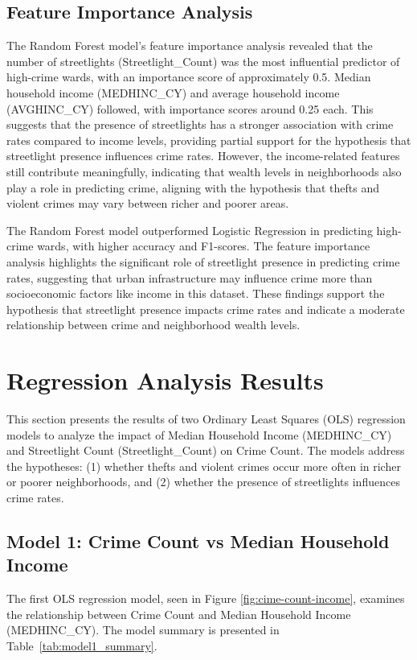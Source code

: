 \documentclass{report}
\begin{document}
\subsection{Feature Importance Analysis}
The Random Forest model's feature importance analysis revealed that the number of streetlights (Streetlight\_Count) was the most influential predictor of high-crime wards, with an importance score of approximately 0.5. Median household income (MEDHINC\_CY) and average household income (AVGHINC\_CY) followed, with importance scores around 0.25 each. This suggests that the presence of streetlights has a stronger association with crime rates compared to income levels, providing partial support for the hypothesis that streetlight presence influences crime rates. However, the income-related features still contribute meaningfully, indicating that wealth levels in neighborhoods also play a role in predicting crime, aligning with the hypothesis that thefts and violent crimes may vary between richer and poorer areas.
\par The Random Forest model outperformed Logistic Regression in predicting high-crime wards, with higher accuracy and F1-scores. The feature importance analysis highlights the significant role of streetlight presence in predicting crime rates, suggesting that urban infrastructure may influence crime more than socioeconomic factors like income in this dataset. These findings support the hypothesis that streetlight presence impacts crime rates and indicate a moderate relationship between crime and neighborhood wealth levels.

\section{Regression Analysis Results}

\par This section presents the results of two Ordinary Least Squares (OLS) regression models to analyze the impact of Median Household Income (MEDHINC\_CY) and Streetlight Count (Streetlight\_Count) on Crime Count. The models address the hypotheses: (1) whether thefts and violent crimes occur more often in richer or poorer neighborhoods, and (2) whether the presence of streetlights influences crime rates.

\subsection{Model 1: Crime Count vs Median Household Income}
\par The first OLS regression model, seen in Figure \ref{fig:cime-count-income}, examines the relationship between Crime Count and Median Household Income (MEDHINC\_CY). The model summary is presented in Table~\ref{tab:model1_summary}.
\end{document}
